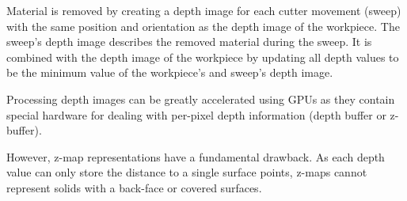\begin{description}
	Material is removed by creating a depth image for each cutter movement (\aka sweep) with the same position and orientation as the depth image of the workpiece.
	The sweep's depth image describes the removed material during the sweep.
	It is combined with the depth image of the workpiece by updating all depth values to be the minimum value of the workpiece's and sweep's depth image.

	Processing depth images can be greatly accelerated using GPUs as they contain special hardware for dealing with per-pixel depth information (\ie depth buffer or z-buffer).
	
	However, z-map representations have a fundamental drawback.
	As each depth value can only store the distance to a single surface points, z-maps cannot represent solids with a back-face or covered surfaces.
	

\end{description}
